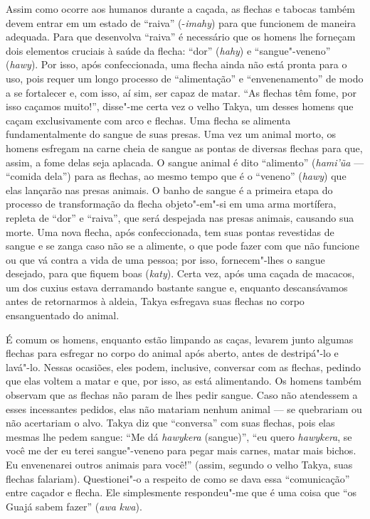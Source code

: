 Assim como ocorre aos humanos durante a caçada, as flechas e tabocas
também devem entrar em um estado de ``raiva'' (-\emph{imahy}) para que
funcionem de maneira adequada. Para que desenvolva ``raiva'' é necessário
que os homens lhe forneçam dois elementos cruciais à saúde da flecha:
``dor'' (\emph{hahy}) e ``sangue"-veneno'' (\emph{hawy}). Por isso, após
confeccionada, uma flecha ainda não está pronta para o uso, pois requer
um longo processo de ``alimentação'' e ``envenenamento'' de modo a se
fortalecer e, com isso, aí sim, ser capaz de matar. ``As flechas têm
fome, por isso caçamos muito!'', disse"-me certa vez o velho Takya, um
desses homens que caçam exclusivamente com arco e flechas. Uma flecha se
alimenta fundamentalmente do sangue de suas presas. Uma vez um animal
morto, os homens esfregam na carne cheia de sangue as pontas de diversas
flechas para que, assim, a fome delas seja aplacada. O sangue animal é
dito ``alimento'' (\emph{hami'ũa} --- ``comida dela'') para as flechas, ao
mesmo tempo que é o ``veneno'' (\emph{hawy}) que elas lançarão nas presas
animais. O banho de sangue é a primeira etapa do processo de
transformação da flecha objeto"-em"-si em uma arma mortífera, repleta de
``dor'' e ``raiva'', que será despejada nas presas animais, causando sua
morte. Uma nova flecha, após confeccionada, tem suas pontas revestidas
de sangue e se zanga caso não se a alimente, o que pode fazer com que
não funcione ou que vá contra a vida de uma pessoa; por isso,
fornecem"-lhes o sangue desejado, para que fiquem boas (\emph{katy}).
Certa vez, após uma caçada de macacos, um dos cuxius estava derramando
bastante sangue e, enquanto descansávamos antes de retornarmos à aldeia,
Takya esfregava suas flechas no corpo ensanguentado do animal.

É comum os homens, enquanto estão limpando as caças, levarem junto
algumas flechas para esfregar no corpo do animal após aberto, antes de
destripá"-lo e lavá"-lo. Nessas ocasiões, eles podem, inclusive, conversar
com as flechas, pedindo que elas voltem a matar e que, por isso, as está
alimentando. Os homens também observam que as flechas não param de lhes
pedir sangue. Caso não atendessem a esses incessantes pedidos, elas não
matariam nenhum animal --- se quebrariam ou não acertariam o alvo. Takya
diz que ``conversa'' com suas flechas, pois elas mesmas lhe pedem sangue:
``Me dá \emph{hawykera} (sangue)'', ``eu quero \emph{hawykera}, se você me
der eu terei sangue"-veneno para pegar mais carnes, matar mais bichos. Eu
envenenarei outros animais para você!'' (assim, segundo o velho Takya,
suas flechas falariam). Questionei"-o a respeito de como se dava essa
``comunicação'' entre caçador e flecha. Ele simplesmente respondeu"-me que
é uma coisa que ``os Guajá sabem fazer'' (\emph{awa} \emph{kwa}).


